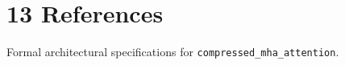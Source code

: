 \section{13 References}

Formal architectural specifications for \texttt{compressed_mha_attention}.
